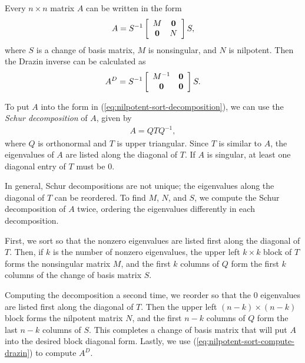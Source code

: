 Every $n \times n$ matrix $A$ can be written in the form
\begin{equation}
A = S^{-1}
\left[\begin{array}{cc}
M & \mathbf{0} \\
\mathbf{0} & N \\
\end{array}\right] S,
\label{eq:nilpotent-sort-decomposition}
\end{equation}
where $S$ is a change of basis matrix, $M$ is nonsingular, and $N$ is nilpotent. 
Then the Drazin inverse can be calculated as
\begin{equation}
A^D = S^{-1}
\left[\begin{array}{cc}
M^{-1} & \mathbf{0} \\
\mathbf{0} & \mathbf{0} \\
\end{array}\right] S.
\label{eq:nilpotent-sort-compute-drazin}
\end{equation}

To put $A$ into the form in (\ref{eq:nilpotent-sort-decomposition}), we can use the \emph{Schur decomposition} of $A$, given by
\begin{align}
A = QTQ^{-1},
\end{align}
where $Q$ is orthonormal and $T$ is upper triangular.
Since $T$ is similar to $A$, the eigenvalues of $A$ are listed along the diagonal of $T$.
If $A$ is singular, at least one diagonal entry of $T$ must be $0$.

In general, Schur decompositions are not unique; the eigenvalues along the diagonal of $T$ can be reordered. 
To find $M$, $N$, and $S$, we compute the Schur decomposition of $A$ twice, ordering the eigenvalues differently in each decomposition. 

First, we sort so that the nonzero eigenvalues are listed first along the diagonal of $T$. Then, if $k$ is the number of nonzero eigenvalues, the upper left $k \times k$ block of $T$ forms the nonsingular matrix $M$, and the first $k$ columns of $Q$ form the first $k$ columns of the change of basis matrix $S$. 

Computing the decomposition a second time, we reorder  so that the $0$ eigenvalues are listed first along the diagonal of $T$. 
Then the upper left $(n-k) \times (n-k)$ block forms the nilpotent matrix $N$, and the first $n-k$ columns of $Q$ form the last $n-k$ columns of $S$. This completes a change of basis matrix that will put $A$ into the desired block diagonal form. 
Lastly, we use (\ref{eq:nilpotent-sort-compute-drazin}) to compute $A^D$.

